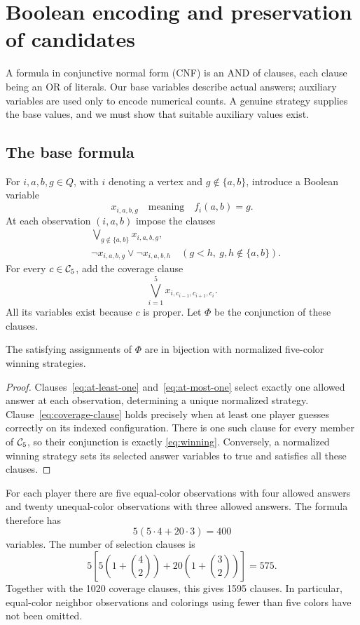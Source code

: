 \section{Boolean encoding and preservation of candidates}\label{sec:encoding}
A formula in conjunctive normal form (CNF) is an AND of clauses, each
clause being an OR of literals. Our base variables describe actual
answers; auxiliary variables are used only to encode numerical counts.
A genuine strategy supplies the base values, and we must show that
suitable auxiliary values exist.
\subsection{The base formula}
For $i,a,b,g\in Q$, with $i$ denoting a vertex and $g\notin\{a,b\}$,
introduce a Boolean variable
\[
x_{i,a,b,g}\quad\text{meaning}\quad f_i(a,b)=g.
\]
At each observation $(i,a,b)$ impose the clauses
\begin{align}
&\bigvee_{g\notin\{a,b\}}x_{i,a,b,g},\label{eq:at-least-one}\\
&\neg x_{i,a,b,g}\lor\neg x_{i,a,b,h}
\quad(g<h,\ g,h\notin\{a,b\}).\label{eq:at-most-one}
\end{align}
For every $c\in\mathcal{C}_5$, add the coverage clause
\begin{equation}\label{eq:coverage-clause}
\bigvee_{i=1}^5x_{i,c_{i-1},c_{i+1},c_i}.
\end{equation}
All its variables exist because $c$ is proper. Let $\Phi$ be the
conjunction of these clauses.

\begin{lemma}\label{lem:base}
The satisfying assignments of $\Phi$ are in bijection with normalized
five-color winning strategies.
\end{lemma}
\begin{proof}
Clauses~\eqref{eq:at-least-one} and~\eqref{eq:at-most-one} select exactly
one allowed answer at each observation, determining a unique normalized
strategy. Clause~\eqref{eq:coverage-clause} holds precisely when at least
one player guesses correctly on its indexed configuration. There is one
such clause for every member of $\mathcal{C}_5$, so their conjunction is exactly
\eqref{eq:winning}. Conversely, a normalized winning strategy sets its
selected answer variables to true and satisfies all these clauses.
\end{proof}

For each player there are five equal-color observations with four allowed
answers and twenty unequal-color observations with three allowed answers.
The formula therefore has
\[
5(5\cdot4+20\cdot3)=400
\]
variables. The number of selection clauses is
\[
5\left[5\left(1+\binom42\right)+20\left(1+\binom32\right)\right]=575.
\]
Together with the 1020 coverage clauses, this gives 1595 clauses. In
particular, equal-color neighbor observations and colorings using fewer
than five colors have not been omitted.

